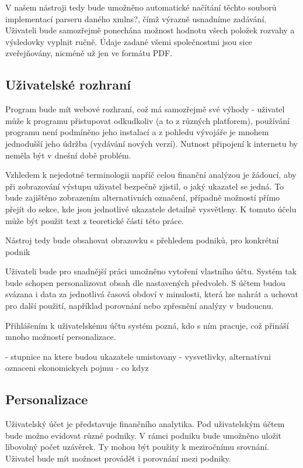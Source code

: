 V našem nástroji tedy bude umožněno automatické načítání těchto souborů implementací parseru daného xmlns?, čímž výrazně usnadníme zadávání.
Uživateli bude samozřejmě ponechána možnost hodnotu všech položek rozvahy a výsledovky vyplnit ručně. Údaje zadané všemi společnostmi jsou sice zveřejňovány, nicméně už jen ve formátu PDF.

\subsection{Uživatelské rozhraní}
Program bude mít webové rozhraní, což má samozřejmě své výhody - uživatel může k programu přistupovat odkudkoliv (a to z různých platforem), používání programu není podmíněno jeho instalací a z pohledu vývojáře je mnohem jednodušší jeho údržba (vydávání nových verzí). Nutnost připojení k internetu by neměla být v dnešní době problém.

Vzhledem k nejedotné terminologii napříč celou finanční analýzou je žádoucí, aby při zobrazování výstupu uživatel bezpečně zjistil, o jaký ukazatel se jedná. To bude zajištěno zobrazením alternativních označení, případně možností přímo přejít do sekce, kde jsou jednotlivé ukazatele detailně vysvětleny. K tomuto účelu může být použit text z teoretické části této práce.

Nástroj tedy bude obsahovat obrazovku s přehledem podniků, pro konkrétní podnik 

Uživateli bude pro snadnější práci umožněno vytoření vlastního účtu. Systém tak bude schopen personalizovat obsah dle nastavených předvoleb. S účtem budou svázana i data za jednotlivá časová obdoví v minulosti, která lze nahrát a uchovat pro další použití, například porovnání nebo zpřesnění analýzy v budoucnu.

Přihlášením k uživatelskému účtu systém pozná, kdo s ním pracuje, což přináší mnoho možností personalizace.

- stupnice na ktere budou ukazatele umistovany
- vysvetlivky, alternativni oznaceni ekonomickych pojmu
- co kdyz


\subsection{Personalizace}
Uživatelský účet je představuje finančního analytika. Pod uživatelským účtem bude možno evidovat různé podniky. V rámci podniku bude umožněno uložit libovolný počet uzávěrek. Ty mohou být použity k meziročnímu srovnání.
Uživatel bude mít možnost provádět i porovnání mezi podniky.

